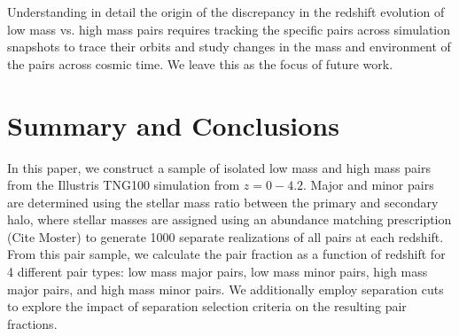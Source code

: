 \documentclass[twocolumn]{aastex631}
\begin{document}
    Understanding in detail the origin of the discrepancy in the redshift evolution of low mass vs. high mass pairs requires tracking the specific pairs across simulation snapshots to trace their orbits and study changes in the mass and environment of the pairs across cosmic time.  
    We leave this as the focus of future work.
    

    
 

\section{Summary and Conclusions}\label{sec:summary}
In this paper, we construct a sample of isolated low mass and high mass pairs from the Illustris TNG100 simulation from $z=0-4.2$. %
Major and minor pairs are determined using the stellar mass ratio between the primary and secondary halo, %
where stellar masses are assigned using an abundance matching prescription (Cite Moster) to generate 1000 separate realizations of all pairs at each redshift. %
From this pair sample, we calculate the pair fraction as a function of redshift for 4 different pair types: low mass major pairs, low mass minor pairs, high mass major pairs, and high mass minor pairs. 
We additionally employ separation cuts to explore the impact of separation selection criteria on the resulting pair fractions.
\end{document}
